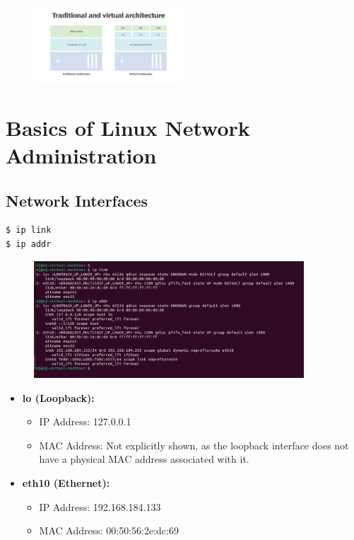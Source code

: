 \documentclass{report}
\begin{document}
\begin{figure}[h] 
    \centering 
    \includegraphics[width=0.5\textwidth]{2.jpg}
\end{figure} 


\chapter*{Basics of Linux Network Administration}

\section*{Network Interfaces}






\begin{lstlisting}[language=bash]
$ ip link 
$ ip addr
\end{lstlisting}

\begin{figure}[h] 
  \centering 
  \includegraphics[width=0.9\textwidth]{11.png}
\end{figure} 



\begin{itemize}
  \item \textbf{lo (Loopback):}
    \begin{itemize}
      \item IP Address: 127.0.0.1
      \item MAC Address: Not explicitly shown, as the loopback interface does not have a physical MAC address associated with it.
    \end{itemize}
  
  \item \textbf{eth10 (Ethernet):}
    \begin{itemize}
      \item IP Address: 192.168.184.133
      \item MAC Address: 00:50:56:2e:dc:69
    \end{itemize}
\end{itemize}
\end{document}
